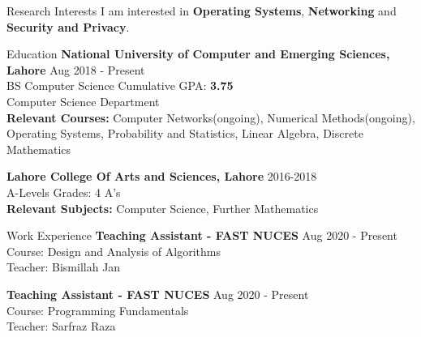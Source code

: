 \documentclass{resume} %
\begin{document}

\begin{rSection}{Research Interests}
I am interested in {\bf Operating Systems}, {\bf Networking} and {\bf Security and Privacy}.
\end{rSection}




\begin{rSection}{Education}
{\bf National University of Computer and Emerging Sciences, Lahore} \hfill {Aug 2018 - Present} 
\\ BS Computer Science \hfill { Cumulative GPA: \bf3.75 }
\\ Computer Science Department\\
{\bf Relevant Courses:} Computer Networks(ongoing), Numerical Methods(ongoing), Operating Systems, Probability and Statistics, Linear Algebra, Discrete Mathematics

{\bf Lahore College Of Arts and Sciences, Lahore} \hfill {2016-2018}
\\ A-Levels \hfill {Grades: 4 A's}
\\{\bf Relevant Subjects:} Computer Science, Further Mathematics
\end{rSection}



\begin{rSection}{Work Experience}
{\bf Teaching Assistant - FAST NUCES} \hfill { Aug 2020 - Present}
\\Course: Design and Analysis of Algorithms
\\Teacher: Bismillah Jan

{\bf Teaching Assistant - FAST NUCES} \hfill { Aug 2020 - Present}
\\Course: Programming Fundamentals
\\Teacher: Sarfraz Raza

\end{rSection}
\end{document}
